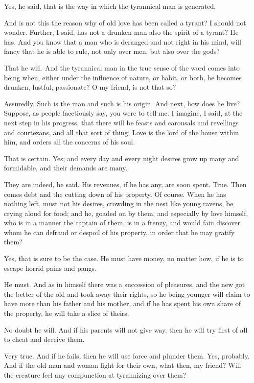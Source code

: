 Yes, he said, that is the way in which the tyrannical man is generated.

And is not this the reason why of old love has been called a tyrant?
I should not wonder.
Further, I said, has not a drunken man also the spirit of a tyrant?
He has.
And you know that a man who is deranged and not right in his mind, will fancy that he is able to rule, not only over men, but also over the gods?

That he will.
And the tyrannical man in the true sense of the word comes into being when, either under the influence of nature, or habit, or both, he becomes drunken, lustful, passionate? O my friend, is not that so?

Assuredly.
Such is the man and such is his origin. And next, how does he live?
Suppose, as people facetiously say, you were to tell me.
I imagine, I said, at the next step in his progress, that there will be feasts and carousals and revellings and courtezans, and all that sort of thing; Love is the lord of the house within him, and orders all the concerns of his soul.

That is certain.
Yes; and every day and every night desires grow up many and formidable, and their demands are many.

They are indeed, he said.
His revenues, if he has any, are soon spent.
True.
Then comes debt and the cutting down of his property.
Of course.
When he has nothing left, must not his desires, crowding in the nest like young ravens, be crying aloud for food; and he, goaded on by them, and especially by love himself, who is in a manner the captain of them, is in a frenzy, and would fain discover whom he can defraud or despoil of his property, in order that he may gratify them?

Yes, that is sure to be the case.
He must have money, no matter how, if he is to escape horrid pains and pangs.

He must.
And as in himself there was a succession of pleasures, and the new got the better of the old and took away their rights, so he being younger will claim to have more than his father and his mother, and if he has spent his own share of the property, he will take a slice of theirs.

No doubt he will.
And if his parents will not give way, then he will try first of all to cheat and deceive them.

Very true.
And if he fails, then he will use force and plunder them.
Yes, probably.
And if the old man and woman fight for their own, what then, my friend? Will the creature feel any compunction at tyrannizing over them?

